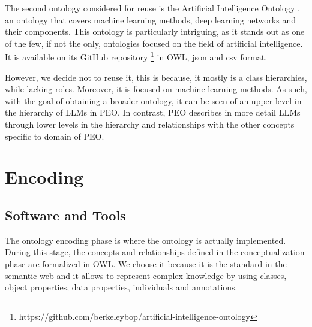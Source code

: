 The second ontology considered for reuse is the Artificial Intelligence Ontology \cite{aio}, an ontology that covers machine learning methods, deep learning networks and their components.
This ontology is particularly intriguing, as it stands out as one of the few, if not the only, ontologies focused on the field of artificial intelligence.
It is available on its GitHub repository \footnote{https://github.com/berkeleybop/artificial-intelligence-ontology} in OWL, json and csv format. 

However, we decide not to reuse it, this is because, it mostly is a class hierarchies, while lacking roles.
Moreover, it is focused on machine learning methods.
As such, with the goal of obtaining a broader ontology, it can be seen of an upper level in the hierarchy of LLMs in PEO.
In contrast, PEO describes in more detail LLMs through lower levels in the hierarchy and relationships with the other concepts specific to domain of PEO.




\section{Encoding}
\label{section:4_3_encoding}
\subsection{Software and Tools}
\label{subsection:4_3_1_software}
The ontology encoding phase is where the ontology is actually implemented.
During this stage, the concepts and relationships defined in the conceptualization phase are formalized in OWL. We choose it because it is the standard in the semantic web and it allows to represent complex knowledge by using classes, object properties, data properties, individuals and annotations.


